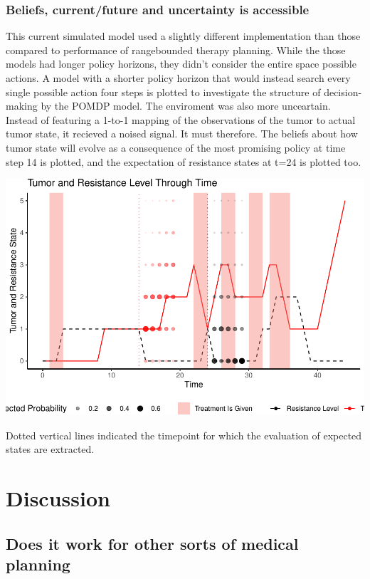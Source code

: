 \documentclass[notspecified,article,submit,moreauthors,pdftex]{Definitions/mdpi}
\begin{document}
\subsubsection{Beliefs, current/future and uncertainty is
accessible}\label{beliefs-currentfuture-and-uncertainty-is-accessible}

This current simulated model used a slightly different implementation
than those compared to performance of rangebounded therapy planning.
While the those models had longer policy horizons, they didn't consider
the entire space possible actions. A model with a shorter policy horizon
that would instead search every single possible action four steps is
plotted to investigate the structure of decision-making by the POMDP
model. The enviroment was also more unceartain. Instead of featuring a
1-to-1 mapping of the observations of the tumor to actual tumor state,
it recieved a noised signal. It must therefore. The beliefs about how
tumor state will evolve as a consequence of the most promising policy at
time step 14 is plotted, and the expectation of resistance states at
t=24 is plotted too.

\includegraphics{SocultPaper_files/figure-latex/unnamed-chunk-7-1.pdf}

Dotted vertical lines indicated the timepoint for which the evaluation
of expected states are extracted.

\section{Discussion}\label{discussion}

\subsection{Does it work for other sorts of medical
planning}\label{does-it-work-for-other-sorts-of-medical-planning}
\end{document}
